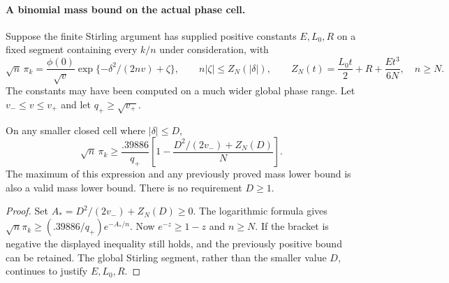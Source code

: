 \paragraph{A binomial mass bound on the actual phase cell.}
Suppose the finite Stirling argument has supplied positive constants
$E,L_0,R$ on a fixed segment containing every $k/n$ under consideration, with
\[
 \sqrt n\,\pi_k=\frac{\phi(0)}{\sqrt v}
       \exp\{-\delta^2/(2nv)+\zeta\},\qquad
 n|\zeta|\le Z_N(|\delta|),\qquad
 Z_N(t)=\frac{L_0t}{2}+R+\frac{Et^3}{6N},
 \quad n\ge N.
\]
The constants may have been computed on a much wider global phase range.
Let $v_-\le v\le v_+$ and let $q_+\ge\sqrt{v_+}$.
\begin{lemma}\label{j:local:lem:mass}
On any smaller closed cell where $|\delta|\le D$,
\[
 \sqrt n\,\pi_k\ge
 \frac{.39886}{q_+}
 \left[1-\frac{D^2/(2v_-)+Z_N(D)}N\right].
\]
The maximum of this expression and any previously proved mass lower bound
is also a valid mass lower bound. There is no requirement $D\ge1$.
\end{lemma}
\begin{proof}
Set $A_*=D^2/(2v_-)+Z_N(D)\ge0$. The logarithmic formula gives
$\sqrt n\pi_k\ge(.39886/q_+)e^{-A_*/n}$.
Now $e^{-z}\ge1-z$ and $n\ge N$. If the bracket is negative the displayed
inequality still holds, and the previously positive bound can be retained.
The global Stirling segment, rather than the smaller value $D$, continues
to justify $E,L_0,R$.
\end{proof}

